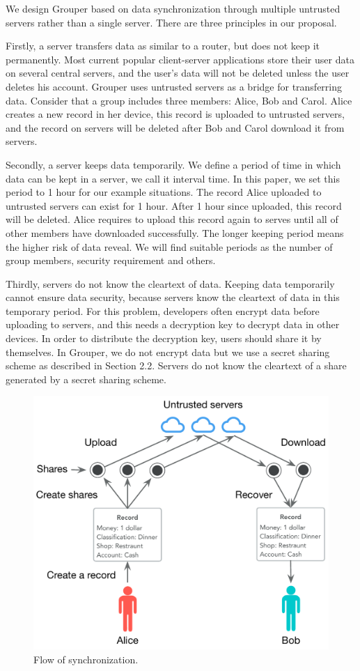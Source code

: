 \documentclass[twocolumn,10pt]{article}
\begin{document}
We design Grouper based on data synchronization through multiple untrusted servers rather than a single server. There are three principles in our proposal. 

Firstly, a server transfers data as similar to a router, but does not keep it permanently. Most current popular client-server applications store their user data on several central servers, and the user's data will not be deleted unless the user deletes his account. Grouper uses untrusted servers as a bridge for transferring data. Consider that a group includes three members: Alice, Bob and Carol. Alice creates a new record in her device, this record is uploaded to untrusted servers, and the record on servers will be deleted after Bob and Carol download it from servers.

Secondly, a server keeps data temporarily. We define a period of time in which data can be kept in a server, we call it interval time. In this paper, we set this period to 1 hour for our example situations. The record Alice uploaded to untrusted servers can exist for 1 hour. After 1 hour since uploaded, this record will be deleted. Alice requires to upload this record again to serves until all of other members have downloaded successfully. The longer keeping period means the higher risk of data reveal. We will find suitable periods as the number of group members, security requirement and others. 

Thirdly, servers do not know the cleartext of data. Keeping data temporarily cannot ensure data security, because servers know the cleartext of data in this temporary period. For this problem, developers often encrypt data before uploading to servers, and this needs a decryption key to decrypt data in other devices. In order to distribute the decryption key, users should share it by themselves. In Grouper, we do not encrypt data but we use a secret sharing scheme as described in Section 2.2. Servers do not know the cleartext of a share generated by a secret sharing scheme.

\begin{figure}[t]
	\centering
	\includegraphics[scale=0.38]{sync_flow}
	\caption{Flow of synchronization.}
\end{figure}
\end{document}
